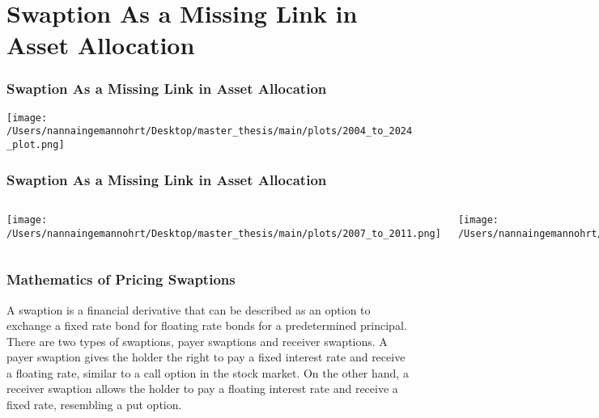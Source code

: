 \documentclass{beamer}
\begin{document}
\section{Swaption As a Missing Link in Asset Allocation}
\begin{frame}
    \frametitle{\textcolor{KUrod}{Swaption As a Missing Link in Asset Allocation}}
    \begin{center}
        \texttt{[image: /Users/nannaingemannohrt/Desktop/master\_thesis/main/plots/2004\_to\_2024\_plot.png]}
    \end{center}
\end{frame}


\begin{frame}
    \frametitle{\textcolor{KUrod}{Swaption As a Missing Link in Asset Allocation}}
    \begin{columns}
        \begin{center}
            \texttt{[image: /Users/nannaingemannohrt/Desktop/master\_thesis/main/plots/2007\_to\_2011.png]}
            \caption{ Global Financial Crisis}
        \end{center}

        \begin{center}
            \texttt{[image: /Users/nannaingemannohrt/Desktop/master\_thesis/main/plots/2022\_to\_2024.png]}
        \end{center}
    \end{columns}
\end{frame}

\begin{frame}
    \frametitle{\textcolor{KUrod}{Mathematics of Pricing Swaptions}}
    A swaption is a financial derivative that can be described as an option to exchange a fixed rate bond for
    floating rate bonds for a predetermined principal. 
    There are two types of swaptions, payer swaptions and receiver swaptions.
    A payer swaption gives the holder the right to pay a fixed interest rate and receive a floating rate, 
    similar to a call option in the stock market. On the other hand, a receiver swaption allows the holder
    to pay a floating interest rate and receive a fixed rate, resembling a put option.
\end{frame} 
\end{document}
